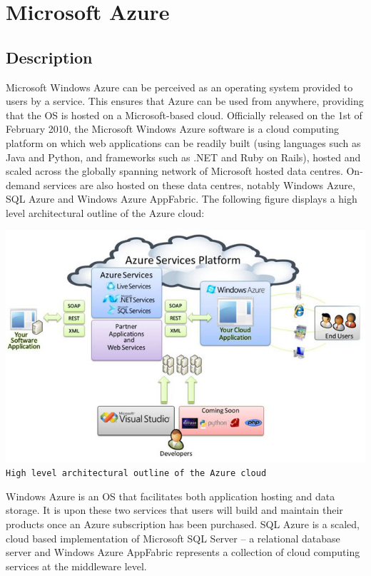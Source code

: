 \chapter{Microsoft Azure}
\section{Description}
Microsoft Windows Azure can be perceived as an operating system provided to users by a service. This ensures that Azure can be used from anywhere, providing that the OS is hosted on a Microsoft-based cloud. Officially released on the 1st of February 2010, the Microsoft Windows Azure software is a cloud computing platform on which web applications can be readily built (using languages such as Java and Python, and frameworks such as .NET and Ruby on Rails), hosted and scaled across the globally spanning network of Microsoft hosted data centres. On-demand services are also hosted on these data centres, notably Windows Azure\ftAone, SQL Azure and Windows Azure AppFabric. The following figure displays a high level architectural outline of the Azure cloud:\ftAoneText

\begin{center}
\includegraphics[scale=0.8]{figs/Azure.png} \\
\texttt{High level architectural outline of the Azure cloud}\ftAimg\ftAimgText
\end{center}

Windows Azure is an OS that facilitates both application hosting and data storage. It is upon these two services that users will build and maintain their products once an Azure subscription has been purchased. SQL Azure is a scaled, cloud based implementation of Microsoft SQL Server -- a relational database server and Windows Azure AppFabric represents a collection of cloud computing services at the middleware level.

